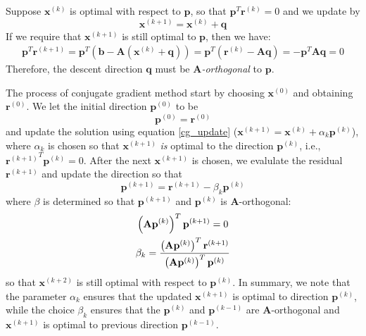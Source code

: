 \documentclass{article}
\begin{document}
Suppose $\mathbf{x}^{(k)}$ is optimal with respect to $\mathbf{p}$, so that 
$\mathbf{p}^T\mathbf{r}^{(k)} = 0$ and we update by 
\begin{equation*}
    \mathbf{x}^{(k+1)} = \mathbf{x}^{(k)} + \mathbf{q}  
\end{equation*}
If we require that $\mathbf{x}^{(k+1)}$ is still optimal to $\mathbf{p}$, then 
we have:
\begin{align*}
    \mathbf{p}^T \mathbf{r}^{(k+1)} 
    = \mathbf{p}^T \left( \mathbf{b} - \mathbf{A}(\mathbf{x}^{(k)} + \mathbf{q}) \right)
    = \mathbf{p}^T \left( \mathbf{r}^{(k)} - \mathbf{A}\mathbf{q} \right)
    = - \mathbf{p}^T \mathbf{A}\mathbf{q} = 0
\end{align*}
Therefore, the descent direction $\mathbf{q}$ must be \emph{$\mathbf{A}$-orthogonal} to 
$\mathbf{p}$. 

The process of conjugate gradient method start by choosing $\mathbf{x}^{(0)}$ and 
obtaining $\mathbf{r}^{(0)}$. We let the initial direction $\mathbf{p}^{(0)}$ to be 
\[\mathbf{p}^{(0)} = \mathbf{r}^{(0)}\]
and update the solution using equation \eqref{cg_update}
($\mathbf{x}^{(k+1)} = \mathbf{x}^{(k)} + \alpha_k \mathbf{p}^{(k)}$),
where $\alpha_k$ is chosen so that $\mathbf{x}^{(k+1)}$ \emph{is} optimal to the 
direction $\mathbf{p}^{(k)}$, i.e., $\left.\mathbf{r}^{(k+1)}\right.^T \mathbf{p}^{(k)} = 0$.
After the next $\mathbf{x}^{(k+1)}$ is chosen, we evalulate the residual $\mathbf{r}^{(k+1)}$
and update the direction so that
\begin{equation}
    \mathbf{p}^{(k+1)} = \mathbf{r}^{(k+1)} - \beta_k \mathbf{p}^{(k)}
\end{equation}
where $\beta$ is determined so that $\mathbf{p}^{(k+1)}$ and $\mathbf{p}^{(k)}$
is $\mathbf{A}$-orthogonal:
\begin{gather}
    \left(\mathbf{A} \mathbf{p}^{(k)} \right)^T \mathbf{p}^{(k+1)} = 0 \notag\\
    \beta_k = \frac{\left(\mathbf{A} \mathbf{p}^{(k)} \right)^T \mathbf{r}^{(k+1)}}{\left(\mathbf{A} \mathbf{p}^{(k)} \right)^T \mathbf{p}^{(k)}}
\end{gather}
so that $\mathbf{x}^{(k+2)}$ is still optimal with respect to $\mathbf{p}^{(k)}$. 
In summary, 
we note that the parameter $\alpha_k$ ensures that the updated $\mathbf{x}^{(k+1)}$
is optimal to direction $\mathbf{p}^{(k)}$, while the choice $\beta_k$ ensures 
that the $\mathbf{p}^{(k)}$ and $\mathbf{p}^{(k-1)}$ are $\mathbf{A}$-orthogonal
and $\mathbf{x}^{(k+1)}$ is optimal to previous direction $\mathbf{p}^{(k-1)}$.
\end{document}
